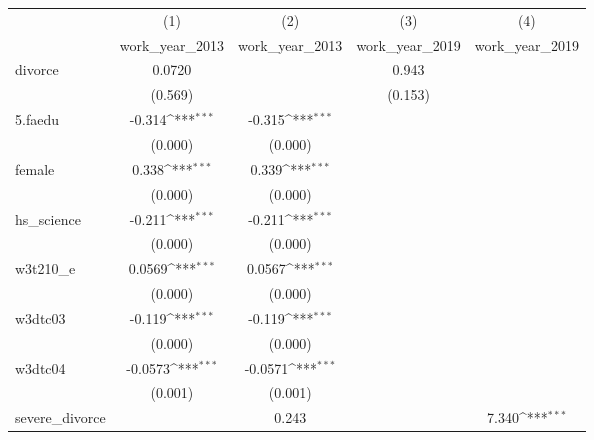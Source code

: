 {
\def\sym#1{\ifmmode^{#1}\else\(^{#1}\)\fi}
\begin{tabular}{l*{4}{c}}
\hline\hline
            &\multicolumn{1}{c}{(1)}&\multicolumn{1}{c}{(2)}&\multicolumn{1}{c}{(3)}&\multicolumn{1}{c}{(4)}\\
            &\multicolumn{1}{c}{work\_year\_2013}&\multicolumn{1}{c}{work\_year\_2013}&\multicolumn{1}{c}{work\_year\_2019}&\multicolumn{1}{c}{work\_year\_2019}\\
\hline
divorce     &      0.0720         &                     &       0.943         &                     \\
            &     (0.569)         &                     &     (0.153)         &                     \\
[1em]
5.faedu     &      -0.314\sym{***}&      -0.315\sym{***}&                     &                     \\
            &     (0.000)         &     (0.000)         &                     &                     \\
[1em]
female      &       0.338\sym{***}&       0.339\sym{***}&                     &                     \\
            &     (0.000)         &     (0.000)         &                     &                     \\
[1em]
hs\_science  &      -0.211\sym{***}&      -0.211\sym{***}&                     &                     \\
            &     (0.000)         &     (0.000)         &                     &                     \\
[1em]
w3t210\_e    &      0.0569\sym{***}&      0.0567\sym{***}&                     &                     \\
            &     (0.000)         &     (0.000)         &                     &                     \\
[1em]
w3dtc03     &      -0.119\sym{***}&      -0.119\sym{***}&                     &                     \\
            &     (0.000)         &     (0.000)         &                     &                     \\
[1em]
w3dtc04     &     -0.0573\sym{***}&     -0.0571\sym{***}&                     &                     \\
            &     (0.001)         &     (0.001)         &                     &                     \\
[1em]
severe\_divorce&                     &       0.243         &                     &       7.340\sym{***}\\

\end{tabular}}
